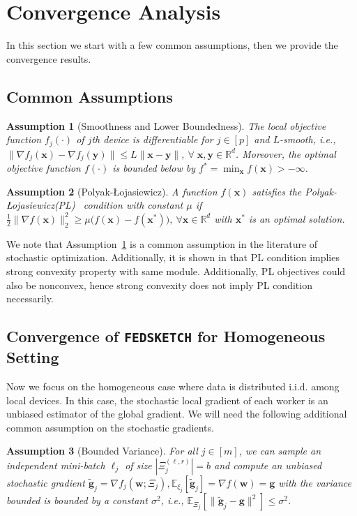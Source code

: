 \documentclass[twoside]{article}
\newcommand{\pl}{Polyak-\L{}ojasiewicz}
\newtheorem{assumption}{Assumption}
\begin{document}
\section{Convergence Analysis}\label{sec:cnvg-an}
In this section we start with a few common assumptions, then we provide the convergence results.


\subsection{Common Assumptions}


\begin{assumption}[Smoothness and Lower Boundedness]\label{Assu:1}
The local objective function $f_j(\cdot)$ of $j$th device is differentiable for $j\in [p]$ and $L$-smooth, i.e., $\|\nabla f_j(\boldsymbol{x})-\nabla f_j(\mathbf{y})\|\leq L\|\boldsymbol{x}-\mathbf{y}\|,\: \forall \;\boldsymbol{x},\mathbf{y}\in\mathbb{R}^d$. Moreover, the optimal objective function $f(\cdot)$ is bounded below by ${f^*} = \min_{\boldsymbol{x}} f(\boldsymbol{x})>-\infty$. 
\end{assumption}

\begin{assumption}[\pl]\label{assum:pl}
A function $f(\boldsymbol{x})$ satisfies the \pl (PL)~ condition with constant $\mu$ if $\frac{1}{2}\|\nabla f(\boldsymbol{x})\|_2^2\geq \mu\big(f(\boldsymbol{x})-f(\boldsymbol{x}^*)\big),\: \forall \boldsymbol{x}\in\mathbb{R}^d $ with $\boldsymbol{x}^*$ is an optimal solution.
\end{assumption}

We note that Assumption~\ref{Assu:1} is a common assumption in the literature of stochastic optimization. Additionally, it is shown in \cite{karimi2016linear} that PL condition implies strong convexity property with same module. Additionally, PL objectives could also be nonconvex, hence strong convexity does not imply PL condition necessarily.  

\subsection{Convergence of  \texttt{FEDSKETCH} for Homogeneous Setting} 
Now we focus on the homogeneous case where data is distributed i.i.d. among local devices. In this case, the stochastic local gradient of each worker is an unbiased estimator of the global gradient. We will need the following additional common assumption on the stochastic gradients.


\begin{assumption}[Bounded Variance]\label{Assu:1.5}
For all $j\in [m]$, we can sample an independent mini-batch $\ell_j$   of size $|\Xi_j^{(\ell,r)}| = b$ and compute an unbiased stochastic gradient  $\tilde{\mathbf{g}}_j = \nabla f_j(\boldsymbol{w}; \Xi_j), \mathbb{E}_{\xi_j}[\tilde{\mathbf{g}}_j] = \nabla f(\boldsymbol{w})=\mathbf{g}$ with  the variance bounded is bounded by a constant $\sigma^2$, i.e., $
\mathbb{E}_{\Xi_j}\left[\|\tilde{\mathbf{g}}_j-\mathbf{g}\|^2\right]\leq \sigma^2$.
\end{assumption}
\end{document}
